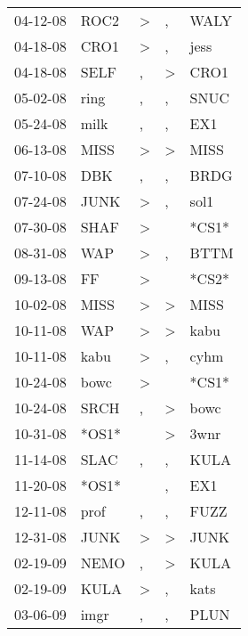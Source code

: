\begin{supertabular}{lllll}
 04-12-08 &   ROC2 &     \textgreater &                , &   WALY \\
 04-18-08 &   CRO1 &     \textgreater &                , &   jess \\
 04-18-08 &   SELF &                , &     \textgreater &   CRO1 \\
 05-02-08 &   ring &                , &                , &   SNUC \\
 05-24-08 &   milk &                , &                , &    EX1 \\
 06-13-08 &   MISS &     \textgreater &     \textgreater &   MISS \\
 07-10-08 &    DBK &                , &                , &   BRDG \\
 07-24-08 &   JUNK &     \textgreater &                , &   sol1 \\
 07-30-08 &   SHAF &     \textgreater &                  &  *CS1* \\
 08-31-08 &    WAP &     \textgreater &                , &   BTTM \\
 09-13-08 &     FF &     \textgreater &                  &  *CS2* \\
 10-02-08 &   MISS &     \textgreater &     \textgreater &   MISS \\
 10-11-08 &    WAP &     \textgreater &     \textgreater &   kabu \\
 10-11-08 &   kabu &     \textgreater &                , &   cyhm \\
 10-24-08 &   bowc &     \textgreater &                  &  *CS1* \\
 10-24-08 &   SRCH &                , &     \textgreater &   bowc \\
 10-31-08 &  *OS1* &                  &     \textgreater &   3wnr \\
 11-14-08 &   SLAC &                , &                , &   KULA \\
 11-20-08 &  *OS1* &                  &                , &    EX1 \\
 12-11-08 &   prof &                , &                , &   FUZZ \\
 12-31-08 &   JUNK &     \textgreater &     \textgreater &   JUNK \\
 02-19-09 &   NEMO &                , &     \textgreater &   KULA \\
 02-19-09 &   KULA &     \textgreater &                , &   kats \\
 03-06-09 &   imgr &                , &                , &   PLUN \\

\end{supertabular}
